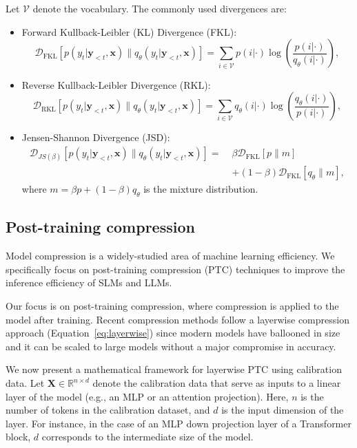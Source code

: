 Let $\mathcal{V}$ denote the vocabulary. The commonly used divergences are:
\begin{itemize}
    \item Forward Kullback-Leibler (KL) Divergence (FKL):
\begin{equation*}
\mathcal{D}_{\text{FKL}} \left[ p(y_t | \mathbf{y}_{<t}, \mathbf{x}) \| q_\theta (y_t | \mathbf{y}_{<t}, \mathbf{x}) \right] = \sum_{i \in \mathcal{V}} p(i | \cdot) \log \left( \frac{p(i | \cdot)}{q_\theta (i | \cdot)} \right),
\end{equation*}
    \item Reverse Kullback-Leibler Divergence (RKL):
\begin{equation*}
\mathcal{D}_{\text{RKL}} \left[ p(y_t | \mathbf{y}_{<t}, \mathbf{x}) \| q_\theta (y_t | \mathbf{y}_{<t}, \mathbf{x}) \right] = \sum_{i \in \mathcal{V}} q_\theta (i | \cdot) \log \left( \frac{q_\theta (i | \cdot)}{p(i | \cdot)} \right),
\end{equation*}
    \item Jensen-Shannon Divergence (JSD):
\begin{align*}
\mathcal{D}_{JS(\beta)} \left[ p(y_t | \mathbf{y}_{<t}, \mathbf{x}) \| q_\theta(y_t | \mathbf{y}_{<t}, \mathbf{x}) \right] = \; &   \beta \mathcal{D}_{\text{FKL}} \left[ p \| m \right] \\ & + (1 - \beta) \mathcal{D}_{\text{FKL}} \left[ q_\theta \| m \right],
\end{align*}
where \( m = \beta p + (1 - \beta) q_\theta \) is the mixture distribution.
\end{itemize}



\subsection{Post-training compression}

Model compression is a widely-studied area of machine learning efficiency. We specifically focus on post-training compression (PTC) techniques to improve the inference efficiency of SLMs and LLMs. 


Our focus is on post-training compression, where compression is applied to the model after training. Recent compression methods follow a layerwise compression approach (Equation~\ref{eq:layerwise}) since modern models have ballooned in size and it can be scaled to large models without a major compromise in accuracy. 

We now present a mathematical framework for layerwise PTC using calibration data. Let
$\mathbf{X} \in \mathbb{R}^{n \times d}$
denote the calibration data that serve as inputs to a linear layer of the model (e.g., an MLP or an attention projection). Here, \( n \) is the number of tokens in the calibration dataset, and \( d \) is the input dimension of the layer. For instance, in the case of an MLP down projection layer of a Transformer block, \( d \) corresponds to the intermediate size of the model.

